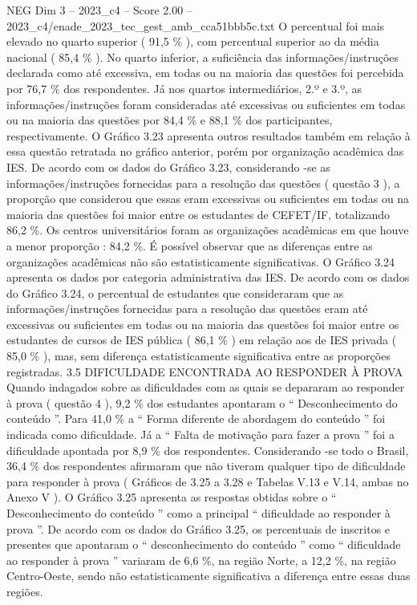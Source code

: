 \begin{textsample}{NEG Dim 3 – 2023\_c4 – Score 2.00 – 2023\_c4/enade\_2023\_tec\_gest\_amb\_cca51bbb5c.txt}
O percentual foi mais elevado no quarto superior ( 91,5 \% ), com percentual superior ao da média nacional ( 85,4 \% ).
No quarto inferior, a suficiência das informações/instruções declarada como até excessiva, em todas ou na maioria das questões foi percebida por 76,7 \% dos respondentes.
Já nos quartos intermediários, 2.º e 3.º, as informações/instruções foram consideradas até excessivas ou suficientes em todas ou na maioria das questões por 84,4 \% e 88,1 \% dos participantes, respectivamente.
O Gráfico 3.23 apresenta outros resultados também em relação à essa questão retratada no gráfico anterior, porém por organização acadêmica das IES.
De acordo com os dados do Gráfico 3.23, considerando -se as informações/instruções fornecidas para a resolução das questões ( questão 3 ), a proporção que considerou que essas eram excessivas ou suficientes em todas ou na maioria das questões foi maior entre os estudantes de CEFET/IF, totalizando 86,2 \%.
Os centros universitários foram as organizações acadêmicas em que houve a menor proporção : 84,2 \%.
É possível observar que as diferenças entre as organizações acadêmicas não são estatisticamente significativas.
O Gráfico 3.24 apresenta os dados por categoria administrativa das IES.
De acordo com os dados do Gráfico 3.24, o percentual de estudantes que consideraram que as informações/instruções fornecidas para a resolução das questões eram até excessivas ou suficientes em todas ou na maioria das questões foi maior entre os estudantes de cursos de IES pública ( 86,1 \% ) em relação aos de IES privada ( 85,0 \% ), mas, sem diferença estatisticamente significativa entre as proporções registradas. 3.5 DIFICULDADE ENCONTRADA AO RESPONDER À PROVA Quando indagados sobre as dificuldades com as quais se depararam ao responder à prova ( questão 4 ), 9,2 \% dos estudantes apontaram o “ Desconhecimento do conteúdo ”.
Para 41,0 \% a “ Forma diferente de abordagem do conteúdo ” foi indicada como dificuldade.
Já a “ Falta de motivação para fazer a prova ” foi a dificuldade apontada por 8,9 \% dos respondentes.
Considerando -se todo o Brasil, 36,4 \% dos respondentes afirmaram que não tiveram qualquer tipo de dificuldade para responder à prova ( Gráficos de 3.25 a 3.28 e Tabelas V.13 e V.14, ambas no Anexo V ).
O Gráfico 3.25 apresenta as respostas obtidas sobre o “ Desconhecimento do conteúdo ” como a principal “ dificuldade ao responder à prova ”.
De acordo com os dados do Gráfico 3.25, os percentuais de inscritos e presentes que apontaram o “ desconhecimento do conteúdo ” como “ dificuldade ao responder à prova ” variaram de 6,6 \%, na região Norte, a 12,2 \%, na região Centro-Oeste, sendo não estatisticamente significativa a diferença entre essas duas regiões.

\end{textsample}
